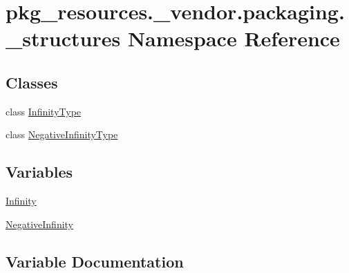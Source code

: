\hypertarget{namespacepkg__resources_1_1__vendor_1_1packaging_1_1__structures}{}\section{pkg\+\_\+resources.\+\_\+vendor.\+packaging.\+\_\+structures Namespace Reference}
\label{namespacepkg__resources_1_1__vendor_1_1packaging_1_1__structures}
\subsection*{Classes}
\begin{DoxyCompactItemize}
\item 
class \hyperlink{classpkg__resources_1_1__vendor_1_1packaging_1_1__structures_1_1InfinityType}{Infinity\+Type}
\item 
class \hyperlink{classpkg__resources_1_1__vendor_1_1packaging_1_1__structures_1_1NegativeInfinityType}{Negative\+Infinity\+Type}
\end{DoxyCompactItemize}
\subsection*{Variables}
\begin{DoxyCompactItemize}
\item 
\hyperlink{namespacepkg__resources_1_1__vendor_1_1packaging_1_1__structures_aee143aa292ad9b0f7d355b2374c7435c}{Infinity}
\item 
\hyperlink{namespacepkg__resources_1_1__vendor_1_1packaging_1_1__structures_a26c25ea67496bc85a0593919613efc08}{Negative\+Infinity}
\end{DoxyCompactItemize}


\subsection{Variable Documentation}
\mbox{\label{namespacepkg__resources_1_1__vendor_1_1packaging_1_1__structures_aee143aa292ad9b0f7d355b2374c7435c}} 
